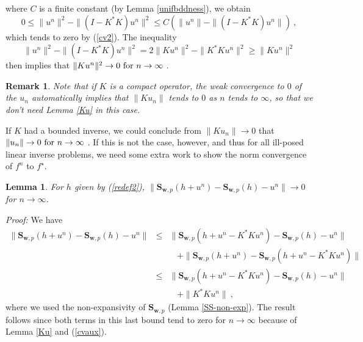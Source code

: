 \documentclass[10pt]{article}
\newtheorem{lemma}[theorem]{Lemma}
\newtheorem{remark}[theorem]{Remark}
\newcommand{\QED}{\hfill \raisebox{-2pt}{\rule{5.6pt}{8pt}\rule{4pt}{0pt}}%
  \smallskip\par}
\def\S{\mathbf{S}}
\def\K{K^*}
\begin{document}
where $C$ is a finite constant (by Lemma \ref{unifbddness}), we obtain
\begin{equation*}
0 \leq \| u^n \|^2 - \| (I-K^*K)u^n \|^2 \leq
C (\| u^n \| - \| (I-K^*K)u^n \|)\ ,
\end{equation*}
which tends to zero by (\ref{cv2}).
The inequality
\begin{equation*}
\| u^n \|^2 - \| (I-K^*K)u^n \|^2 =
2\| Ku^n\|^2-\|\K Ku^n\|^2 \geq \| Ku^n\|^2
\end{equation*}
then implies that $\| Ku^n\|^2 \to 0 \ {\rm for}\  n \to \infty\ $.
\hfill\QED
\begin{remark}
\label{ifKcomp}
{\rm Note that if $K$ is a compact operator, the weak convergence
to $0$ of the $u_n$ automatically implies that $\|K u_n\|$ tends
to $0$ as $n$ tends to $\infty$, so that we don't need
Lemma \ref{Ku} in this case.}
\end{remark}

\bigskip

If $K$ had a bounded inverse, we could conclude from $\|K u_n\| \to 0$ that
$\| u_n\|
\to 0
\ {\rm for}\  n \to \infty\ $. If this is not the case, however,
and thus for all
ill-posed linear inverse problems, we need some extra work to show the norm
convergence of $f^n$ to $f^\star$.
\begin{lemma}
For $h$ given by {\rm (\ref{redef2})},
$\| {\S}_{\mathbf{w},p}(h+u^n) - {\S}_{\mathbf{w},p}(h) - u^n \| \to 0$ for
$n \to
\infty$.
\end{lemma}
{\em Proof:}
We have
\begin{eqnarray*}
\| {\S}_{\mathbf{w},p}(h+u^n) - {\S}_{\mathbf{w},p}(h) - u^n \|
&\leq& \| {\S}_{\mathbf{w},p}(h+u^n-K^*Ku^n) - {\S}_{\mathbf{w},p}(h) - u^n
\|\\ &&~~~~+
\|{\S}_{\mathbf{w},p}(h+u^n) - {\S}_{\mathbf{w},p}(h+u^n-K^*Ku^n) \| \\
&\leq& \| {\S}_{\mathbf{w},p}(h+u^n-K^*Ku^n) - {\S}_{\mathbf{w},p}(h) - u^n
\|\\ &&
~~~~+\|\K Ku^n \|~,
\end{eqnarray*}
where we used the non-expansivity of ${\S}_{\mathbf{w},p}$ (Lemma
\ref{SS-non-exp}).
The result follows since both terms in this last bound tend to zero for $n \to
\infty$ because of Lemma
\ref{Ku} and (\ref{cvaux}).
\hfill\QED

\bigskip
\end{document}
